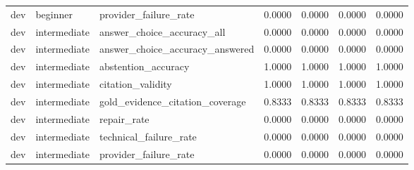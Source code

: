 \documentclass[10pt]{article}
\begin{document}
\begin{longtable}{lllrrrr}
dev & beginner & provider\_failure\_rate & 0.0000 & 0.0000 & 0.0000 & 0.0000 \\
dev & intermediate & answer\_choice\_accuracy\_all & 0.0000 & 0.0000 & 0.0000 & 0.0000 \\
dev & intermediate & answer\_choice\_accuracy\_answered & 0.0000 & 0.0000 & 0.0000 & 0.0000 \\
dev & intermediate & abstention\_accuracy & 1.0000 & 1.0000 & 1.0000 & 1.0000 \\
dev & intermediate & citation\_validity & 1.0000 & 1.0000 & 1.0000 & 1.0000 \\
dev & intermediate & gold\_evidence\_citation\_coverage & 0.8333 & 0.8333 & 0.8333 & 0.8333 \\
dev & intermediate & repair\_rate & 0.0000 & 0.0000 & 0.0000 & 0.0000 \\
dev & intermediate & technical\_failure\_rate & 0.0000 & 0.0000 & 0.0000 & 0.0000 \\
dev & intermediate & provider\_failure\_rate & 0.0000 & 0.0000 & 0.0000 & 0.0000 \\
\bottomrule
\end{longtable}
\end{document}
